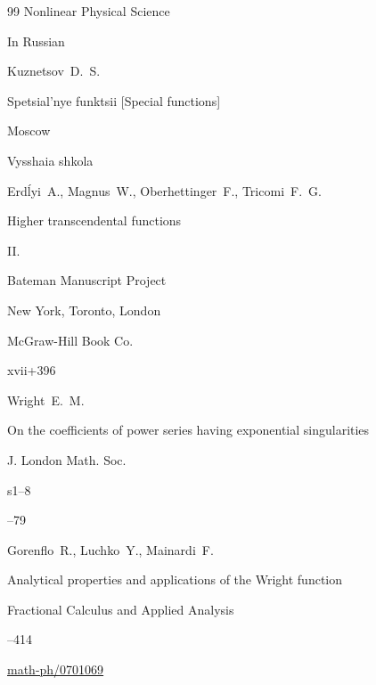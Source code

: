 \begin{thebibliography}{99}
\serial Nonlinear Physical Science









\lang In Russian

\by Kuznetsov~D.~S.

\book Spetsial'nye funktsii \rm [Special functions]

\publaddr Moscow

\publ Vysshaia shkola








\by Erd\'lyi~A., Magnus~W., Oberhettinger~F., Tricomi~F.~G.

\book Higher transcendental functions

\bookvol II. 

\serial Bateman Manuscript Project

\publaddr New York, Toronto, London

\publ McGraw-Hill Book Co.

\totalpages xvii+396 






\by Wright~E.~M.

\paper On the coefficients of power series having exponential singularities

\jour J. London Math. Soc.

\vol s1--8



--79







\by Gorenflo~R., Luchko~Y., Mainardi~F.

\paper Analytical properties and applications of the Wright  function

\jour Fractional Calculus and Applied Analysis




--414

\arxiv \href{http://arxiv.org/abs/math-ph/0701069}{math-ph/0701069}





\end{thebibliography}



\EngDate



\newpage

\Russian



%

%

